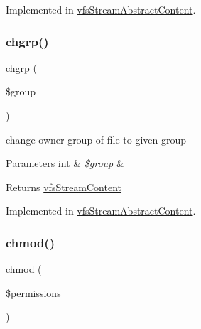 Implemented in \mbox{\hyperlink{classorg_1_1bovigo_1_1vfs_1_1vfs_stream_abstract_content_a807677a6a863886bc4aa2dbc1f473d56}{vfs\+Stream\+Abstract\+Content}}.

\mbox{\label{interfaceorg_1_1bovigo_1_1vfs_1_1vfs_stream_content_ae3667c8a6ad2f23f1163ba4533a20525}} 
\subsubsection{\texorpdfstring{chgrp()}{chgrp()}}
{\footnotesize\ttfamily chgrp (\begin{DoxyParamCaption}\item[{}]{\$group }\end{DoxyParamCaption})}

change owner group of file to given group


\begin{DoxyParams}[1]{Parameters}
int & {\em \$group} & \\
\hline
\end{DoxyParams}
\begin{DoxyReturn}{Returns}
\mbox{\hyperlink{interfaceorg_1_1bovigo_1_1vfs_1_1vfs_stream_content}{vfs\+Stream\+Content}} 
\end{DoxyReturn}


Implemented in \mbox{\hyperlink{classorg_1_1bovigo_1_1vfs_1_1vfs_stream_abstract_content_ae3667c8a6ad2f23f1163ba4533a20525}{vfs\+Stream\+Abstract\+Content}}.

\mbox{\label{interfaceorg_1_1bovigo_1_1vfs_1_1vfs_stream_content_a6c64687533218867184ace2d0015b230}} 
\subsubsection{\texorpdfstring{chmod()}{chmod()}}
{\footnotesize\ttfamily chmod (\begin{DoxyParamCaption}\item[{}]{\$permissions }\end{DoxyParamCaption})}

